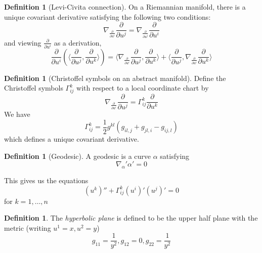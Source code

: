\documentclass[10pt, oneside, reqno]{amsart}
\newcommand{\deriv}[1]{\frac{\partial}{\partial u^{#1}}}
\newcommand{\christ}[3]{\ensuremath{\Gamma^{#1}_{#2#3}}}
\theoremstyle{plain}%
\theoremstyle{definition}
\newtheorem{defn}[thm]{Definition}
\theoremstyle{remark}
\begin{document}
\begin{defn}[Levi-Civita connection]
    On a Riemannian manifold, there is a unique covariant derivative satisfying the following two conditions:
    \[
        \nabla_{\frac{\partial}{\partial u^i}} \frac{\partial}{\partial u^j} = \nabla_{\frac{\partial}{\partial u^j}} \frac{\partial}{\partial u^i} 
    \]
    and viewing $\frac{\partial}{\partial u^i}$ as a derivation,\[
        \deriv{i} (\langle \deriv{j},\deriv{k}\rangle) = \langle \nabla_{\deriv{i}} \deriv{j},\deriv{k}\rangle + \langle \deriv{j},\nabla_{\deriv{i}} \deriv{k} \rangle
    \]
    
\end{defn}

\begin{defn}[Christoffel symbols on an abstract manifold]
    Define the Christoffel symbols \christ{k}{i}{j} with respect to a local coordinate chart by \[
        \nabla_\deriv{i} \deriv{j} = \christ{k}{i}{j} \deriv{k}
    \]
    We have \[
        \christ{k}{i}{j} = \frac{1}{2}g^{kl}\left( g_{il,j} + g_{jl,i} - g_{ij,l} \right)
        \] which defines a unique covariant derivative.
\end{defn}

\begin{defn}[Geodesic]
    A geodesic is a curve $\alpha$ satisfying 
    \[ \nabla_\alpha' \alpha' = 0 \]
    
    This gives us the equations \[
        (u^k)'' + \christ{k}{i}{j}(u^i)'(u^j)' = 0
    \] for $k = 1,\dots,n$
\end{defn}


\begin{defn}
    The \emph{hyperbolic plane} is defined to be the upper half plane with the metric (writing $u^1 = x, u^2 = y$) \[
        g_{11} = \frac{1}{y^2}, g_{12} = 0, g_{22} = \frac{1}{y^2}
    \]
\end{defn}
\end{document}
